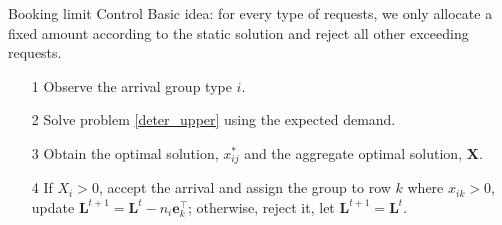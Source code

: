       \begin{frame}{Booking limit Control}
        Basic idea: for every type of requests, we only allocate a fixed amount according to the static solution and reject all other exceeding requests.
        \begin{itemize}
          \item[1] Observe the arrival group type $i$.
          \item[2] Solve problem \eqref{deter_upper} using the expected demand.
          \item[3] Obtain the optimal solution, $x_{ij}^{*}$ and the aggregate optimal solution, $\mathbf{X}$.
          \item[4] If $X_{i} > 0$, accept the arrival and assign the group to row $k$ where $x_{ik} > 0$, update $\mathbf{L}^{t+1} = \mathbf{L}^{t} - n_i \mathbf{e}_{k}^{\top}$; otherwise, reject it, let $\mathbf{L}^{t+1} = \mathbf{L}^{t}$.
        \end{itemize}
                 
      \end{frame}
